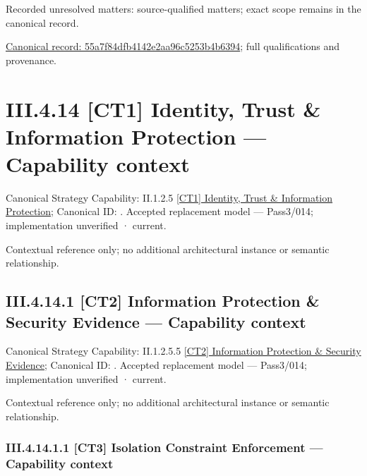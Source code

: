{\small Recorded unresolved matters: source-qualified matters; exact scope remains in the canonical record.}\par
{\footnotesize \href{../../../../../../../continuum/business/business-service/55a7f84dfb4142e2aa96c5253b4b6394.md}{Canonical record: 55a7f84dfb4142e2aa96c5253b4b6394}; full qualifications and provenance.}\par
\section*{III.4.14 [CT1] Identity, Trust \& Information Protection — Capability context}
\label{navigation:III.4.14}

{\small Canonical Strategy Capability: II.1.2.5 \hyperref[element:def358c06649413ba4773582e0d5c6d4]{[CT1] Identity, Trust \& Information Protection}; Canonical ID: \texttt{}. Accepted replacement model — Pass3/014; implementation unverified · current.}\par
Contextual reference only; no additional architectural instance or semantic relationship.\par
\subsection*{III.4.14.1 [CT2] Information Protection \& Security Evidence — Capability context}
\label{navigation:III.4.14.1}

{\small Canonical Strategy Capability: II.1.2.5.5 \hyperref[element:ece1a982b80e46e0a868b4865dfcdfc3]{[CT2] Information Protection \& Security Evidence}; Canonical ID: \texttt{}. Accepted replacement model — Pass3/014; implementation unverified · current.}\par
Contextual reference only; no additional architectural instance or semantic relationship.\par
\subsubsection*{III.4.14.1.1 [CT3] Isolation Constraint Enforcement — Capability context}
\label{navigation:III.4.14.1.1}

